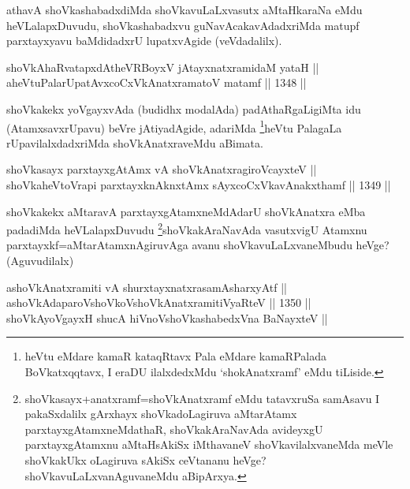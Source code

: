 \begin{artha}
athavA shoVkashabadxdiMda shoVkavuLaLxvasutx aMtaHkaraNa eMdu heVLalapxDuvudu, shoVkashabadxvu guNavAcakavAdadxriMda matupf parxtayxyavu baMdidadxrU lupatxvAgide (veVdadalilx).
\end{artha}


\begin{shl}
shoVkAhaRvatapxdAtheVRBoyxV jAtayxnatxramidaM yataH || \\
aheVtuPalarUpatAvxcoCxVkAnatxramatoV matamf \hfill || 1348 ||  
\end{shl}

\begin{artha}
shoVkakekx yoVgayxvAda (budidhx modalAda) padAthaRgaLigiMta idu (AtamxsavxrUpavu) beVre jAtiyadAgide, adariMda \footnote{heVtu eMdare kamaR kataqRtavx Pala eMdare kamaRPalada BoVkatxqqtavx, I eraDU ilalxdedxMdu `shokAnatxramf' eMdu tiLiside.}heVtu PalagaLa rUpavilalxdadxriMda shoVkAnatxraveMdu aBimata.
\end{artha}


\begin{shl}
shoVkasayx parxtayxgAtAmx vA shoVkAnatxragiroVcayxteV || \\
shoVkaheVtoVrapi parxtayxknAknxtAmx sAyxcoCxVkavAnakxthamf \hfill || 1349 ||  
\end{shl}

\begin{artha}
shoVkakekx aMtaravA parxtayxgAtamxneMdAdarU shoVkAnatxra eMba padadiMda heVLalapxDuvudu \footnote{shoVkasayx+anatxramf=shoVkAnatxramf eMdu tatavxruSa samAsavu I pakaSxdalilx gArxhayx shoVkadoLagiruva aMtarAtamx parxtayxgAtamxneMdathaR, shoVkakAraNavAda avideyxgU parxtayxgAtamxnu aMtaHsAkiSx iMthavaneV shoVkavilalxvaneMda meVle shoVkakUkx oLagiruva sAkiSx  ceVtananu heVge? shoVkavuLaLxvanAguvaneMdu aBipArxya.}shoVkakAraNavAda vasutxvigU Atamxnu parxtayxkf=aMtarAtamxnAgiruvAga avanu shoVkavuLaLxvaneMbudu heVge? (Aguvudilalx)
\end{artha}


\begin{shl}
ashoVkAnatxramiti vA shurxtayxnatxrasamAsharxyAtf ||  \\
\footnotemark[2]ashoVkAdaparoV\s shoVkoV\s shoVkAnatxramitiVyaRteV \hfill || 1350 ||  \\
shoVkAyoVgayxH shucA hiVnoV\s shoVkashabedxVna BaNayxteV || 
\end{shl}

